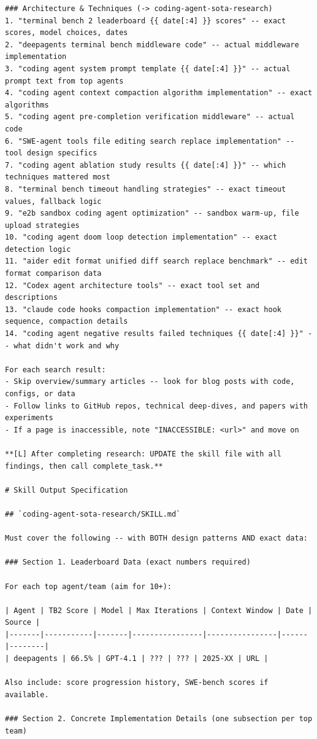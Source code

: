 \begin{tcolorbox}
\begin{lstlisting}
### Architecture & Techniques (-> coding-agent-sota-research)
1. "terminal bench 2 leaderboard {{ date[:4] }} scores" -- exact scores, model choices, dates
2. "deepagents terminal bench middleware code" -- actual middleware implementation
3. "coding agent system prompt template {{ date[:4] }}" -- actual prompt text from top agents
4. "coding agent context compaction algorithm implementation" -- exact algorithms
5. "coding agent pre-completion verification middleware" -- actual code
6. "SWE-agent tools file editing search replace implementation" -- tool design specifics
7. "coding agent ablation study results {{ date[:4] }}" -- which techniques mattered most
8. "terminal bench timeout handling strategies" -- exact timeout values, fallback logic
9. "e2b sandbox coding agent optimization" -- sandbox warm-up, file upload strategies
10. "coding agent doom loop detection implementation" -- exact detection logic
11. "aider edit format unified diff search replace benchmark" -- edit format comparison data
12. "Codex agent architecture tools" -- exact tool set and descriptions
13. "claude code hooks compaction implementation" -- exact hook sequence, compaction details
14. "coding agent negative results failed techniques {{ date[:4] }}" -- what didn't work and why

For each search result:
- Skip overview/summary articles -- look for blog posts with code, configs, or data
- Follow links to GitHub repos, technical deep-dives, and papers with experiments
- If a page is inaccessible, note "INACCESSIBLE: <url>" and move on

**[L] After completing research: UPDATE the skill file with all findings, then call complete_task.**

# Skill Output Specification

## `coding-agent-sota-research/SKILL.md`

Must cover the following -- with BOTH design patterns AND exact data:

### Section 1. Leaderboard Data (exact numbers required)

For each top agent/team (aim for 10+):

| Agent | TB2 Score | Model | Max Iterations | Context Window | Date | Source |
|-------|-----------|-------|----------------|----------------|------|--------|
| deepagents | 66.5% | GPT-4.1 | ??? | ??? | 2025-XX | URL |

Also include: score progression history, SWE-bench scores if available.

### Section 2. Concrete Implementation Details (one subsection per top team)


\end{lstlisting}
\end{tcolorbox}
